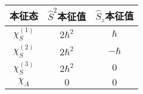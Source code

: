 \documentclass[UTF8,twocolumn]{ctexart}
\begin{document}
\begin{table}[h]
  \centering
  \begin{tabular}	{|c|c|c|}
    \hline
    \textbf{本征态} & \textbf{$\hat{S}^2$本征值}
    & \textbf{$\hat{S}_z$本征值}  \\ 
    \hline
    $\chi_S^{(1)}$ & $2\hbar^2$ & $\hbar$ \\
    \hline
    $\chi_S^{(2)}$ & $2\hbar^2$ & $-\hbar$ \\
    \hline
    $\chi_S^{(3)}$ & $2\hbar^2$ & $0$ \\
    \hline
    $\chi_A$ & $0$ & $0$ \\
    \hline
  \end{tabular}
\end{table}
\end{document}
